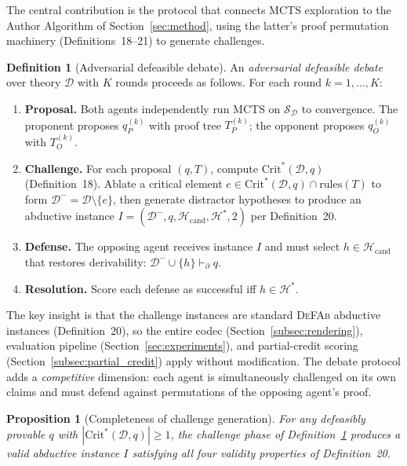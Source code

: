 \documentclass{article}
\newtheorem{proposition}[theorem]{Proposition}
\theoremstyle{definition}
\newtheorem{definition}[theorem]{Definition}
\newcommand{\D}{\mathcal{D}}
\newcommand{\Dm}{\mathcal{D}^{-}}
\newcommand{\Hcand}{\mathcal{H}_{\mathrm{cand}}}
\newcommand{\Hgold}{\mathcal{H}^{*}}
\newcommand{\CritStar}{\mathrm{Crit}^{*}}
\newcommand{\pPartial}{\vdash_{\partial}}
\newcommand{\SD}{\mathcal{S}_{\D}}
\begin{document}
The central contribution is the protocol that connects MCTS exploration to the Author Algorithm of Section~\ref{sec:method}, using the latter's proof permutation machinery (Definitions~18--21) to generate challenges.

\begin{definition}[Adversarial defeasible debate]\label{def:debate-protocol}
An \emph{adversarial defeasible debate} over theory $\D$ with $K$ rounds proceeds as follows. For each round $k = 1, \ldots, K$:
\begin{enumerate}[nosep]
  \item \textbf{Proposal.} Both agents independently run MCTS on $\SD$ to convergence. The proponent proposes $q_P^{(k)}$ with proof tree $T_P^{(k)}$; the opponent proposes $q_O^{(k)}$ with $T_O^{(k)}$.
  \item \textbf{Challenge.} For each proposal $(q, T)$, compute $\CritStar(\D, q)$ (Definition~18). Ablate a critical element $e \in \CritStar(\D, q) \cap \mathrm{rules}(T)$ to form $\Dm = \D \setminus \{e\}$, then generate distractor hypotheses to produce an abductive instance $I = (\Dm, q, \Hcand, \Hgold, 2)$ per Definition~20.
  \item \textbf{Defense.} The opposing agent receives instance $I$ and must select $h \in \Hcand$ that restores derivability: $\Dm \cup \{h\} \pPartial q$.
  \item \textbf{Resolution.} Score each defense as successful iff $h \in \Hgold$.
\end{enumerate}
\end{definition}

The key insight is that the challenge instances are standard \textsc{DeFAb} abductive instances (Definition~20), so the entire codec (Section~\ref{subsec:rendering}), evaluation pipeline (Section~\ref{sec:experiments}), and partial-credit scoring (Section~\ref{subsec:partial_credit}) apply without modification. The debate protocol adds a \emph{competitive} dimension: each agent is simultaneously challenged on its own claims and must defend against permutations of the opposing agent's proof.

\begin{proposition}[Completeness of challenge generation]
\label{prop:debate-complete}
For any defeasibly provable $q$ with $|\CritStar(\D, q)| \geq 1$, the challenge phase of Definition~\ref{def:debate-protocol} produces a valid abductive instance $I$ satisfying all four validity properties of Definition~20.
\end{proposition}
\end{document}
